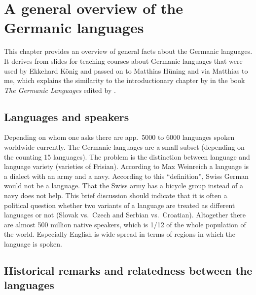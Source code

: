 \chapter{A general overview of the Germanic languages}

This chapter provides an overview of general facts about the Germanic languages. It derives from
slides for teaching courses about Germanic languages that were used by Ekkehard König and passed on
to Matthias Hüning and via Matthias to me, which explains the similarity to the introductionary
chapter by \citet{HvDA94a} in the book \emph{The Germanic Languages} edited by \citet{KvdA94a-ed}.



\section{Languages and speakers}

Depending on whom one asks there are app.\ 5000 to 6000 languages spoken worldwide currently. The
Germanic languages are a small subset (depending on the counting 15 languages).
The problem is the distinction between language and language variety (\eg varieties of
Frisian). According to Max Weinreich a language is a dialect with an army and a navy. According to
this ``definition'', Swiss German would not be a language. That the Swiss army has a bicycle group
instead of a navy does not help. This brief discussion should indicate that it is often a political
question whether two variants of a language are treated as different languages or not (Slovak
vs.\ Czech and Serbian vs.\ Croatian).
Altogether there are almost 500 million native speakers, which is 1/12 of the whole population of
the world. Especially English is wide spread in terms of regions in which the language is spoken.


\section{Historical remarks and relatedness between the languages}


